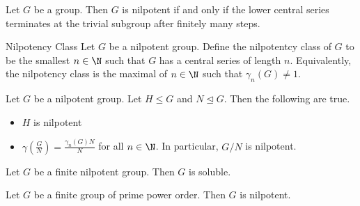 \documentclass[a4paper]{article}
\begin{document}
\begin{prp}{}{} Let $G$ be a group. Then $G$ is nilpotent if and only if the lower central series terminates at the trivial subgroup after finitely many steps. 
\end{prp}

\begin{defn}{Nilpotency Class}{} Let $G$ be a nilpotent group. Define the nilpotentcy class of $G$ to be the smallest $n\in\N$ such that $G$ has a central series of length $n$. Equivalently, the nilpotency class is the maximal of $n\in\N$ such that $\gamma_n(G)\neq 1$. 
\end{defn}

\begin{prp}{}{} Let $G$ be a nilpotent group. Let $H\leq G$ and $N\trianglelefteq G$. Then the following are true. 
\begin{itemize}
\item $H$ is nilpotent
\item $\gamma\left(\frac{G}{N}\right)=\frac{\gamma_n(G)N}{N}$ for all $n\in\N$. In particular, $G/N$ is nilpotent. 
\end{itemize}
\end{prp}

\begin{prp}{}{} Let $G$ be a finite nilpotent group. Then $G$ is soluble. 
\end{prp}

\begin{prp}{}{} Let $G$ be a finite group of prime power order. Then $G$ is nilpotent. 
\end{prp}
\end{document}
